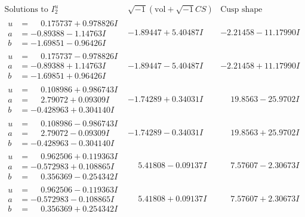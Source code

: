 \documentclass[1p]{elsarticle_modified}
\theoremstyle{definition}
\newcommand{\I}{\sqrt{-1}}
\begin{document}
$$\begin{array}{c|c|c}  
\text{Solutions to }I^u_{2}& \I (\text{vol} + \sqrt{-1}CS) & \text{Cusp shape}\\
 \hline 
\begin{aligned}
u &= \phantom{-}0.175737 + 0.978826 I \\
a &= -0.89388 - 1.14763 I \\
b &= -1.69851 - 0.96426 I\end{aligned}
 & -1.89447 + 5.40487 I & -2.21458 - 11.17990 I \\ \hline\begin{aligned}
u &= \phantom{-}0.175737 - 0.978826 I \\
a &= -0.89388 + 1.14763 I \\
b &= -1.69851 + 0.96426 I\end{aligned}
 & -1.89447 - 5.40487 I & -2.21458 + 11.17990 I \\ \hline\begin{aligned}
u &= \phantom{-}0.108986 + 0.986743 I \\
a &= \phantom{-}2.79072 + 0.09309 I \\
b &= -0.428963 + 0.304140 I\end{aligned}
 & -1.74289 + 0.34031 I & \phantom{-}19.8563 - 25.9702 I \\ \hline\begin{aligned}
u &= \phantom{-}0.108986 - 0.986743 I \\
a &= \phantom{-}2.79072 - 0.09309 I \\
b &= -0.428963 - 0.304140 I\end{aligned}
 & -1.74289 - 0.34031 I & \phantom{-}19.8563 + 25.9702 I \\ \hline\begin{aligned}
u &= \phantom{-}0.962506 + 0.119363 I \\
a &= -0.572983 + 0.108865 I \\
b &= \phantom{-}0.356369 - 0.254342 I\end{aligned}
 & \phantom{-}5.41808 - 0.09137 I & \phantom{-}7.57607 - 2.30673 I \\ \hline\begin{aligned}
u &= \phantom{-}0.962506 - 0.119363 I \\
a &= -0.572983 - 0.108865 I \\
b &= \phantom{-}0.356369 + 0.254342 I\end{aligned}
 & \phantom{-}5.41808 + 0.09137 I & \phantom{-}7.57607 + 2.30673 I \\ \hline\begin{aligned}

\end{aligned}
\end{array}$$
\end{document}
